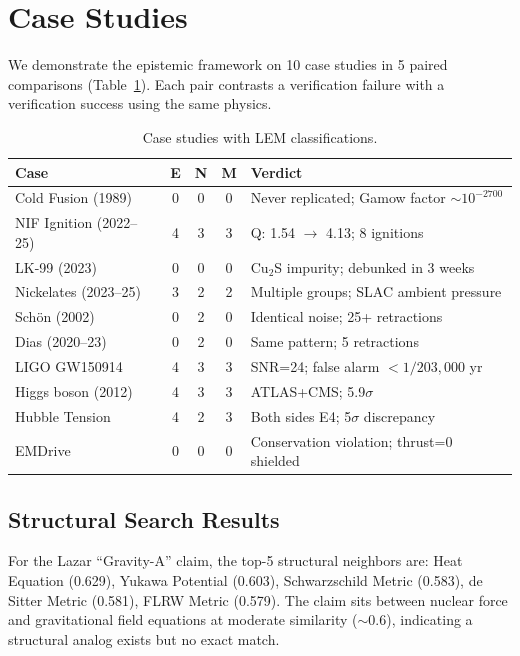 \documentclass[letterpaper,11pt]{article}
\begin{document}
\section{Case Studies}

We demonstrate the epistemic framework on 10 case studies in 5 paired
comparisons (Table~\ref{tab:cases}). Each pair contrasts a verification failure
with a verification success using the same physics.

\begin{table}[h]
\centering
\caption{Case studies with LEM classifications.}
\label{tab:cases}
\begin{tabular}{lcccp{5cm}}
\toprule
Case & E & N & M & Verdict \\
\midrule
Cold Fusion (1989) & 0 & 0 & 0 & Never replicated; Gamow factor $\sim 10^{-2700}$ \\
NIF Ignition (2022--25) & 4 & 3 & 3 & Q: 1.54 $\to$ 4.13; 8 ignitions \\
\midrule
LK-99 (2023) & 0 & 0 & 0 & Cu$_2$S impurity; debunked in 3 weeks \\
Nickelates (2023--25) & 3 & 2 & 2 & Multiple groups; SLAC ambient pressure \\
\midrule
Sch\"on (2002) & 0 & 2 & 0 & Identical noise; 25+ retractions \\
Dias (2020--23) & 0 & 2 & 0 & Same pattern; 5 retractions \\
\midrule
LIGO GW150914 & 4 & 3 & 3 & SNR=24; false alarm $< 1/203{,}000$ yr \\
Higgs boson (2012) & 4 & 3 & 3 & ATLAS+CMS; 5.9$\sigma$ \\
\midrule
Hubble Tension & 4 & 2 & 3 & Both sides E4; 5$\sigma$ discrepancy \\
EMDrive & 0 & 0 & 0 & Conservation violation; thrust=0 shielded \\
\bottomrule
\end{tabular}
\end{table}

\subsection{Structural Search Results}

For the Lazar ``Gravity-A'' claim, the top-5 structural neighbors are:
Heat Equation (0.629), Yukawa Potential (0.603), Schwarzschild Metric (0.583),
de Sitter Metric (0.581), FLRW Metric (0.579). The claim sits between nuclear
force and gravitational field equations at moderate similarity ($\sim$0.6),
indicating a structural analog exists but no exact match.
\end{document}
